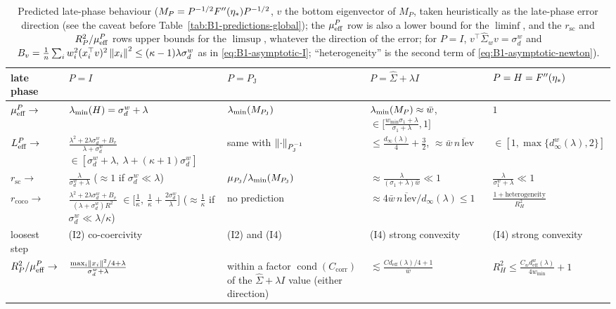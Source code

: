 \begin{table}[ht]
\centering
\footnotesize
\renewcommand{\arraystretch}{1.3}
\begin{tabular}{@{}p{1.6cm}p{3.2cm}p{2.8cm}p{3.6cm}p{3.4cm}@{}}
\toprule
late phase & $P=I$ & $P=P_{\mathrm J}$ & $P=\hat\Sigma+\lambda I$ & $P=H=F''(\eta_\ast)$ \\
\midrule
$\mu_{\mathrm{eff}}^P\to$ & $\lambda_{\min}(H)=\sigma^w_d+\lambda$ & $\lambda_{\min}(M_{P_{\mathrm J}})$
 & $\lambda_{\min}(M_P)\approx\bar w$, \newline $\in\big[\frac{w_{\min}\sigma_1+\lambda}{\sigma_1+\lambda},1\big]$ & $1$ \\[2pt]
$L_{\mathrm{eff}}^P\to$ & $\frac{\lambda^2+2\lambda\sigma^w_d+B_v}{\lambda+\sigma^w_d}$ \newline $\in[\sigma^w_d+\lambda,\ \lambda+(\kappa+1)\sigma^w_d]$ & same with $\left\|\cdot\right\|_{P_{\mathrm J}^{-1}}$
 & $\le\frac{d_\infty(\lambda)}4+\frac32$, $\approx\bar w\,\overline{n\,\mathrm{lev}}$ & $\in[1,\max\{d^w_\infty(\lambda),2\}]$ \\[2pt]
$r_{\mathrm{sc}}\to$ & $\frac{\lambda}{\sigma^w_d+\lambda}$ ($\approx1$ if $\sigma^w_d\ll\lambda$) & $\mu_{P_{\mathrm J}}/\lambda_{\min}(M_{P_{\mathrm J}})$
 & $\approx\frac{\lambda}{(\sigma_1+\lambda)\bar w}\ll1$ & $\frac{\lambda}{\sigma^w_1+\lambda}\ll1$ \\[5pt]
$r_{\mathrm{coco}}\to$ & $\frac{\lambda^2+2\lambda\sigma^w_d+B_v}{(\lambda+\sigma^w_d)R^2}$ \newline $\in\big[\frac1\kappa,\ \frac1\kappa+\frac{2\sigma^w_d}{\lambda}\big]$ \newline ($\approx\frac1\kappa$ if $\sigma^w_d\ll\lambda/\kappa$) & no prediction
 & $\approx4\bar w\,\overline{n\,\mathrm{lev}}/d_\infty(\lambda)\le1$ & $\frac{1+\text{heterogeneity}}{R_H^2}$ \\[2pt]
loosest step & (I2) co-coercivity & (I2) and (I4) & (I4) strong convexity & (I4) strong convexity \\[2pt]
$R_P^2/\mu_{\mathrm{eff}}^P\to$ & $\frac{\max_i\left\|x_i\right\|^2/4+\lambda}{\sigma^w_d+\lambda}$
 & {\raggedright within a factor $\operatorname{cond}(C_{\mathrm{corr}})$ of the $\hat\Sigma+\lambda I$ value
 (either direction)\par}
 & $\lesssim\frac{Cd_{\mathrm{eff}}(\lambda)/4+1}{\bar w}$ & $R_H^2\le\frac{C_wd^w_{\mathrm{eff}}(\lambda)}{4w_{\min}}+1$ \\
\bottomrule
\end{tabular}
\caption{Predicted late-phase behaviour ($M_P=P^{-1/2}F''(\eta_\ast)P^{-1/2}$, $v$ the bottom eigenvector of
$M_P$, taken heuristically as the late-phase error direction (see the caveat before
Table~\ref{tab:B1-predictions-global}); the $\mu_{\mathrm{eff}}^P$ row is also a lower bound for the $\liminf$, and the
$r_{\mathrm{sc}}$ and $R_P^2/\mu_{\mathrm{eff}}^P$ rows upper bounds for the $\limsup$, whatever the direction of the error;
for $P=I$, $v^\top\hat\Sigma_wv=\sigma^w_d$ and
$B_v=\frac1n\sum_iw_i^2(x_i^\top v)^2\left\|x_i\right\|^2\le(\kappa-1)\lambda\sigma^w_d$ as in
\eqref{eq:B1-asymptotic-I}; ``heterogeneity'' is the second term of \eqref{eq:B1-asymptotic-newton}).}
\label{tab:B1-predictions-late}
\end{table}

